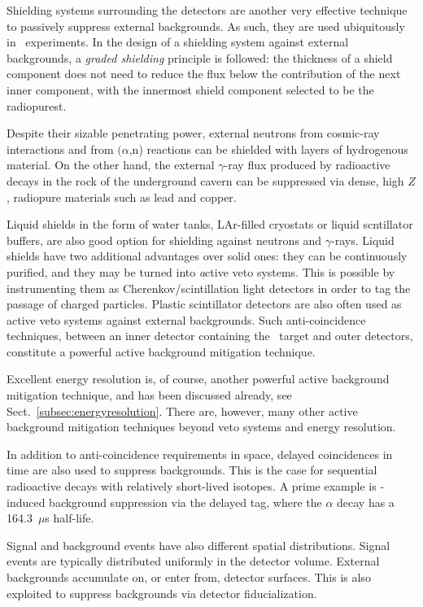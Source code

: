 Shielding systems surrounding the detectors are another very effective technique to passively suppress external backgrounds. As such, they are used ubiquitously in \bbonu\ experiments. In the design of a shielding system against external backgrounds, a \emph{graded shielding} principle is followed: the thickness of a shield component does not need to reduce the flux below the contribution of the next inner component, with the innermost shield component selected to be the radiopurest.

Despite their sizable penetrating power, external neutrons from cosmic-ray interactions and from $(\alpha$,n) reactions can be shielded with layers of hydrogenous material. On the other hand, the external $\gamma$-ray flux produced by radioactive decays in the rock of the underground cavern can be suppressed via dense, high $Z$, radiopure materials such as lead and copper. 

Liquid shields in the form of water tanks, LAr-filled cryostats or liquid scntillator buffers, are also good option for shielding against neutrons and $\gamma$-rays. Liquid shields have two additional advantages over solid ones: they can be continuously purified, and they may be turned into {\emph active} veto systems. This is possible by instrumenting them as Cherenkov/scintillation light detectors in order to tag the passage of charged particles. Plastic scintillator detectors are also often used as active veto systems against external backgrounds. Such anti-coincidence techniques, between an inner detector containing the \bbonu\ target and outer detectors, constitute a powerful active background mitigation technique. 

Excellent energy resolution is, of course, another powerful active background mitigation technique, and has been discussed already, see Sect.~\ref{subsec:energyresolution}. There are, however, many other active background mitigation techniques beyond veto systems and energy resolution. 

In addition to anti-coincidence requirements in space, delayed coincidences in time are also used to suppress backgrounds. This is the case for sequential radioactive decays with relatively short-lived isotopes. A prime example is -induced background suppression via the delayed  tag, where the  $\alpha$ decay has a 164.3~$\mu$s half-life. 

Signal and background events have also different spatial distributions. Signal events are typically distributed uniformly in the detector volume. External backgrounds accumulate on, or enter from, detector surfaces. This is also exploited to suppress backgrounds via detector fiducialization. 

